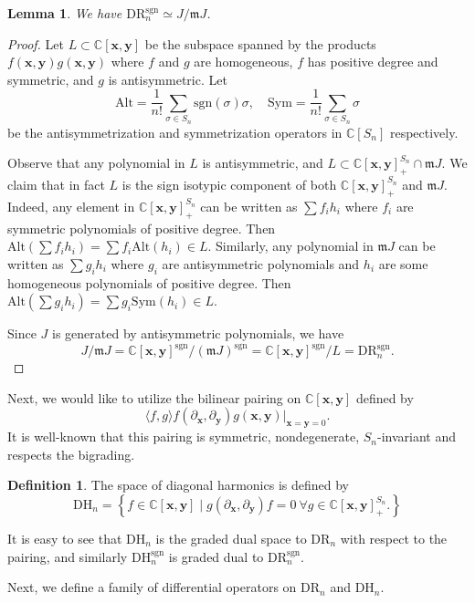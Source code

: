 \documentclass{amsart}
\newcommand{\C}{\mathbb{C}}
\newcommand{\xx}{\mathbf{x}}
\newcommand{\yy}{\mathbf{y}}
\newcommand{\mm}{\mathfrak{m}}
\newcommand{\DR}{\mathrm{DR}}
\newcommand{\Alt}{\mathrm{Alt}}
\newcommand{\Sym}{\mathrm{Sym}}
\renewcommand{\DH}{\mathrm{DH}}
\newcommand{\sgn}{\mathrm{sgn}}
\numberwithin{equation}{section}
\newtheorem{lemma}[theorem]{Lemma}
\theoremstyle{definition}
\newtheorem{definition}[theorem]{Definition}
\begin{document}
\begin{lemma}
\label{lem: catalan}
We have $\DR_n^{\sgn}\simeq J/\mm J$.
\end{lemma}

\begin{proof}
Let $L\subset \C[\xx,\yy]$ be the subspace spanned by the products $f(\xx,\yy)g(\xx,\yy)$ where $f$ and $g$ are homogeneous, $f$ has positive degree and symmetric, and $g$ is antisymmetric. Let 
$$
\Alt=\frac{1}{n!}\sum_{\sigma\in S_n}\sgn(\sigma)\sigma,\quad 
\Sym=\frac{1}{n!}\sum_{\sigma\in S_n}\sigma
$$
be the antisymmetrization and symmetrization operators in $\C[S_n]$ respectively.

Observe that any polynomial in $L$ is antisymmetric, and $L\subset \C[\xx,\yy]^{S_n}_{+}\cap \mm J$.  We claim that in fact $L$ is the sign isotypic component of both $\C[\xx,\yy]^{S_n}_{+}$ and $\mm J$. 
Indeed, any element in $\C[\xx,\yy]^{S_n}_{+}$ can be written as $\sum f_ih_i$ where $f_i$ are symmetric polynomials of positive degree. Then $\Alt(\sum f_ih_i)=\sum f_i\Alt(h_i)\in L$.
Similarly, any polynomial in $\mm J$ can be written as 
$\sum g_i h_i$ where $g_i$ are antisymmetric polynomials and $h_i$ are some homogeneous polynomials of positive degree. Then $\Alt(\sum g_ih_i)=\sum g_i\Sym(h_i)\in L$.

Since $J$ is generated by antisymmetric polynomials, we have
$$
J/\mm J=\C[\xx,\yy]^{\sgn}/(\mm J)^{\sgn}=\C[\xx,\yy]^{\sgn}/L=\DR_n^{\sgn}.
$$
\end{proof}

Next, we would like to utilize the bilinear pairing on $\C[\xx,\yy]$ defined by 
$$
\langle f,g\rangle f(\partial_{\xx},\partial_{\yy})g(\xx,\yy)|_{\xx=\yy=0}.
$$
It is well-known that this pairing is symmetric, nondegenerate, $S_n$-invariant and respects the bigrading.  

\begin{definition}
The space of diagonal harmonics is defined by 
$$
\DH_n=\left\{f\in \C[\xx,\yy]\mid g(\partial_{\xx},\partial_{\yy})f=0\ \forall g\in \C[\xx,\yy]^{S_n}_{+}.\right\}
$$
\end{definition}
It is easy to see that $\DH_n$ is the graded dual space to $\DR_n$ with respect to the pairing, and similarly $\DH_n^{\sgn}$ is graded dual to $\DR_n^{\sgn}$.

Next, we define a family of differential operators on $\DR_n$ and $\DH_n$. 
\end{document}
